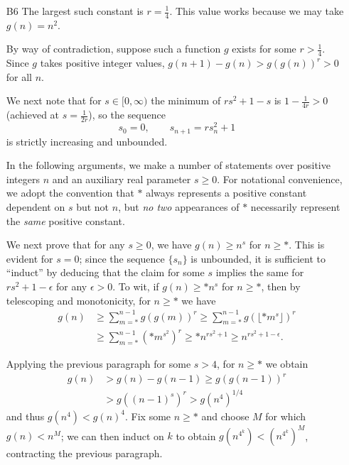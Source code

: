 \documentclass[amssymb,twocolumn,pra,10pt,aps]{revtex4-1}
\begin{document}
\begin{itemize}
Since $p > 3$, $m+I(m) = p\pm 1$ if and only if $m^2 \pm m + 1 = 0$ in $\mathbb{F}_p$;
for each sign, we get 2 solutions if $p \equiv 1 \pmod{3}$ and 0 otherwise. Similarly, $m+I(m) = p$ if and only if $m^2+1 = 0$ in $\mathbb{F}_p$; we get 2 solutions if $p \equiv 1 \pmod{4}$ and 0 otherwise. Hence $f(p)$ equals
\[
\frac{p-1}{2} - (2 \text{ if } p \equiv 1 \!\!\!\!\!\!\pmod{3}) - (1 \text{ if } p \equiv 1 \!\!\!\!\!\!\pmod{4}).
\]
In particular, $f(p) - \left(\tfrac{p}{4} -1\right)\geq \tfrac{p-1}{2} - 2 - \tfrac{p}{4} = \tfrac{p-10}{4}$.
This proves the claim for $p \geq 11$; for $p=5,7$ we compute directly that $f(p) = 1 > \tfrac{p}{4}-1$.

\item[B6]
The largest such constant is $r=\tfrac{1}{4}$. This value works because we may take $g(n) = n^2$.

By way of contradiction, suppose such a function $g$ exists for some $r > \tfrac{1}{4}$.
Since $g$ takes positive integer values, $g(n+1) - g(n) > g(g(n))^r > 0$ for all $n$.

We next note that for $s \in [0, \infty)$ the minimum of $rs^2 + 1 - s$
is $1-\tfrac{1}{4r}> 0$ (achieved at $s = \tfrac{1}{2r}$), so the sequence
\[
s_0 = 0, \qquad s_{n+1} = rs_n^2 + 1
\]
is strictly increasing and unbounded.

In the following arguments, we make a number of statements over positive integers $n$ and an auxiliary real parameter $s \geq 0$. For notational convenience, we adopt the convention that $*$ always represents a positive constant dependent on $s$ but not $n$, but \emph{no two} appearances of $*$ necessarily represent the \emph{same} positive constant.

We next prove that for any $s \geq 0$, we have $g(n) \geq n^s$ for $n \geq *$.
This is evident for $s=0$; since the sequence $\{s_n\}$ is unbounded, it is sufficient to ``induct''
by deducing that the claim for some $s$ implies the same for $rs^2+1-\epsilon$ for any $\epsilon > 0$. To wit,
if $g(n) \geq * n^s$ for $n \geq *$, then by telescoping and monotonicity, for $n \geq *$ we have
\begin{align*}
g(n) &\geq \sum_{m=*}^{n-1} g(g(m))^r \geq \sum_{m=*}^{n-1} g(\lfloor * m^{s}\rfloor )^r \\
&\geq \sum_{m=*}^{n-1} (* m^{s^2})^r \geq * n^{rs^2+1} \geq n^{rs^2+1-\epsilon}.
\end{align*}

Applying the previous paragraph for some $s > 4$, for $n \geq *$ we obtain
\begin{align*}
g(n) &> g(n)-g(n-1) \geq g(g(n-1))^r \\
&> g((n-1)^s)^r > g(n^4)^{1/4}
\end{align*}
and thus $g(n^4) < g(n)^4$. 
Fix some $n \geq *$ and choose $M$ for which $g(n) < n^M$;
we can then induct on $k$ to obtain $g(n^{4^k}) < (n^{4^k})^M$,
contracting the previous paragraph.


\end{itemize}
\end{document}
